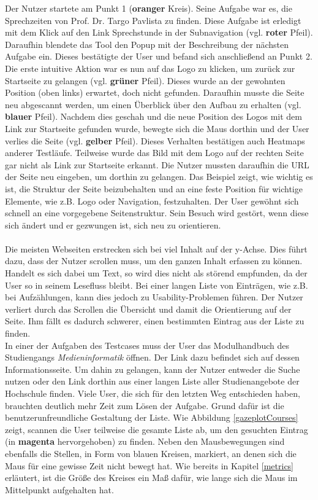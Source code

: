 Der Nutzer startete am Punkt 1 (\textbf{{\color{orange}oranger}} Kreis). Seine Aufgabe war es, die Sprechzeiten von Prof. Dr. Targo Pavlista zu finden. Diese Aufgabe ist erledigt mit dem Klick auf den Link \glqq Sprechstunde\grqq{} in der Subnavigation (vgl. \textbf{{\color{red}roter}} Pfeil). Daraufhin blendete das Tool den Popup mit der Beschreibung der nächsten Aufgabe ein. Dieses bestätigte der User und befand sich anschließend an Punkt 2. Die erste intuitive Aktion war es nun auf das Logo zu klicken, um zurück zur Startseite zu gelangen (vgl. \textbf{{\color{green}grüner}} Pfeil). Dieses wurde an der gewohnten Position (oben links) erwartet, doch nicht gefunden. Daraufhin musste die Seite neu abgescannt werden, um einen Überblick über den Aufbau zu erhalten (vgl. \textbf{{\color{blue}blauer}} Pfeil). Nachdem dies geschah und die neue Position des Logos mit dem Link zur Startseite gefunden wurde, bewegte sich die Maus dorthin und der User verlies die Seite (vgl. \textbf{{\color{yellow}gelber}} Pfeil). Dieses Verhalten bestätigen auch Heatmaps anderer Testläufe. Teilweise wurde das Bild mit dem Logo auf der rechten Seite gar nicht als Link zur Startseite erkannt. Die Nutzer mussten daraufhin die URL der Seite neu eingeben, um dorthin zu gelangen. Das Beispiel zeigt, wie wichtig es ist, die Struktur der Seite beizubehalten und an eine feste Position für wichtige Elemente, wie z.B. Logo oder Navigation, festzuhalten. Der User gewöhnt sich schnell an eine vorgegebene Seitenstruktur. Sein Besuch wird gestört, wenn diese sich ändert und er gezwungen ist, sich neu zu orientieren.\\
\\
Die meisten Webseiten erstrecken sich bei viel Inhalt auf der y-Achse. Dies führt dazu, dass der Nutzer scrollen muss, um den ganzen Inhalt erfassen zu können. Handelt es sich dabei um Text, so wird dies nicht als störend empfunden, da der User so in seinem Lesefluss bleibt. Bei einer langen Liste von Einträgen, wie z.B. bei Aufzählungen, kann dies jedoch zu Usability-Problemen führen. Der Nutzer verliert durch das Scrollen die Übersicht und damit die Orientierung auf der Seite. Ihm fällt es dadurch schwerer, einen bestimmten Eintrag aus der Liste zu finden.\\
In einer der Aufgaben des Testcases muss der User das Modulhandbuch des Studiengangs \textit{Medieninformatik} öffnen. Der Link dazu befindet sich auf dessen Informationsseite. Um dahin zu gelangen, kann der Nutzer entweder die Suche nutzen oder den Link dorthin aus einer langen Liste aller Studienangebote der Hochschule finden. Viele User, die sich für den letzten Weg entschieden haben, brauchten deutlich mehr Zeit zum Lösen der Aufgabe. Grund dafür ist die benutzerunfreundliche Gestaltung der Liste. Wie Abbildung \ref{gazeplotCourses} zeigt, scannen die User teilweise die gesamte Liste ab, um den gesuchten Eintrag (in \textbf{{\color{magenta}magenta}} hervorgehoben) zu finden. Neben den Mausbewegungen sind ebenfalls die Stellen, in Form von blauen Kreisen, markiert, an denen sich die Maus für eine gewisse Zeit nicht bewegt hat. Wie bereits in Kapitel \ref{metrics} erläutert, ist die Größe des Kreises ein Maß dafür, wie lange sich die Maus im Mittelpunkt aufgehalten hat.

